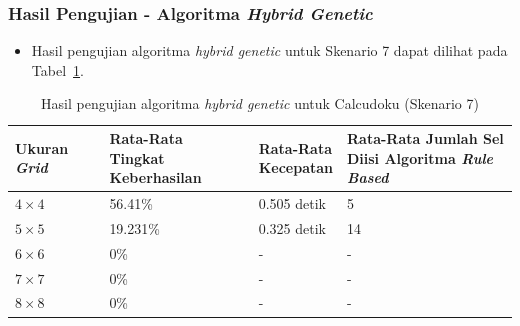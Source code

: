\documentclass{beamer}
\begin{document}
\begin{frame}
\frametitle{Hasil Pengujian - Algoritma \textit{Hybrid Genetic}}
\begin{itemize}
\item Hasil pengujian algoritma \textit{hybrid genetic} untuk Skenario 7 dapat dilihat pada Tabel~\ref{tab:pengujianhg7}.
\end{itemize}
\begin{table}
\tiny
\centering
\captionsetup{justification=centering}
\caption[Hasil pengujian algoritma \textit{hybrid genetic} untuk Calcudoku (Skenario 7)]{Hasil pengujian algoritma \textit{hybrid genetic} untuk Calcudoku (Skenario 7)}
\begin{tabular}{| l | l | l | l |}
\hline
Ukuran \textit{Grid} & \makecell[c]{Rata-Rata \\ Tingkat Keberhasilan} & \makecell[c]{Rata-Rata \\ Kecepatan} & \makecell[c]{Rata-Rata Jumlah Sel \\ Diisi Algoritma \textit{Rule Based}} \\
\hline \hline
\begin{math}4 \times 4\end{math} & 56.41\% & 0.505 detik & 5 \\
\hline
\begin{math}5 \times 5\end{math} & 19.231\% & 0.325 detik & 14 \\
\hline
\begin{math}6 \times 6\end{math} & 0\% & - & - \\
\hline
\begin{math}7 \times 7\end{math} & 0\% & - & - \\
\hline
\begin{math}8 \times 8\end{math} & 0\% & - & - \\
\hline
\end{tabular}
\label{tab:pengujianhg7}
\end{table}
\end{frame}

\end{document}
